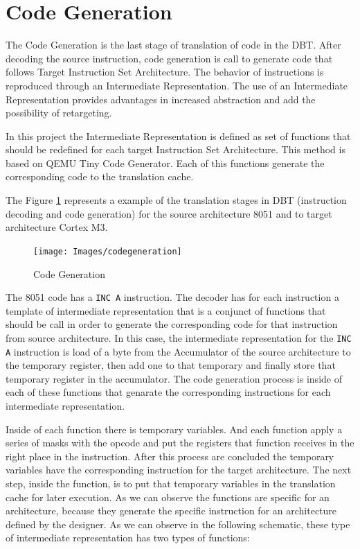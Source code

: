 \documentclass{report}
\begin{document}
	
	\section{Code Generation}
	The Code Generation is the last stage of translation of code in the DBT. After decoding the source instruction, code generation is call to generate code that follows Target Instruction Set Architecture. The behavior of instructions is reproduced through an Intermediate Representation. The use of an Intermediate Representation provides advantages in increased abstraction and add the possibility of retargeting.
	
	In this project the Intermediate Representation is defined as set of functions that should be redefined for each target Instruction Set Architecture. This method is based on QEMU Tiny Code Generator. Each of this functions generate the corresponding code to the translation cache. 
	
	The Figure \ref{fig:generation} represents a example of the translation stages in DBT (instruction decoding and code generation) for the source architecture 8051 and to target architecture Cortex M3.
	
	\begin{figure} [H]
		\centering
		\texttt{[image: Images/codegeneration]}
		\caption{Code Generation}
		\label{fig:generation}
	\end{figure}	
	
	The 8051 code has a \texttt{INC A} instruction. The decoder has for each instruction a template of intermediate representation that is a conjunct of functions that should be call in order to generate the corresponding code for that instruction from source architecture. In this case, the intermediate representation for  the \texttt{INC A} instruction is load of a byte from the Accumulator of the source architecture to the temporary register, then add one to that temporary and finally store that temporary register in the accumulator. The code generation process is inside of each of these functions that genarate the corresponding instructions for each intermediate representation.
	
	Inside of each function there is temporary variables. And each function apply a series of masks with the opcode and put the registers that function receives in the right place in the instruction. After this process are concluded the temporary variables have the corresponding instruction for the target architecture. The next step, inside the function, is to put that temporary variables in the translation cache for later execution. As we can observe the functions are specific for an architecture, because they generate the specific instruction for an architecture defined by the designer. 
	\newpage
	As we can observe in the following schematic, these type of intermediate representation has two types of functions:
	
\end{document}

